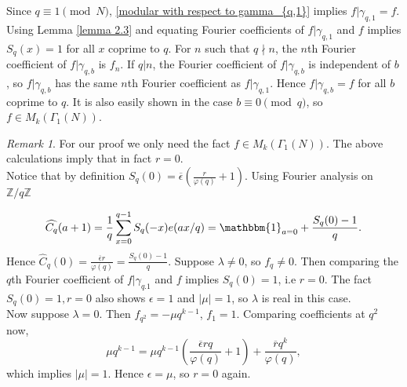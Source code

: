 \documentclass[a4paper,12.5pt]{amsart}
\theoremstyle{definition}
\theoremstyle{remark}
\newtheorem*{rem}{Remark}
\begin{document}
                                 Since $q \equiv 1 \pmod{N}$, \eqref{modular with respect to gamma_{q,1}}  implies
                 $f|\gamma_{q,1}=f$. 
                           Using Lemma \ref{lemma 2.3} and equating Fourier coefficients of $f|\gamma_{q,1}$ and $f$  implies  $S_q(x)=1$ for all $x$ coprime to $q$.
                                For $n$ such that $q \nmid  n $, the $n$th Fourier coefficient of $f|\gamma_{q,b}$ is $f_n$. If $q|n$, the Fourier coefficient of $f|\gamma_{q,b}$ is independent of $b$, so $f|\gamma_{q,b}$ has the same $n$th Fourier coefficient as $f|\gamma_{q,1}$. Hence $f|\gamma_{q,b}=f$ for all $b$ coprime to $q$. It is also easily shown in  the case $b \equiv 0  \pmod{q}$, so  $f \in M_k ( \Gamma_1(N)) $. 
                                
                                \begin{rem}
                               For our proof we only need the fact $f \in M_k ( \Gamma_1(N)) $.  The above calculations imply that in fact $r=0$. \\               
                        
                                Notice that by definition $ S_q(0)=  \overline{ \epsilon } \left( \frac{  r}{ \varphi(q)} +1  \right)          $.
                        Using Fourier analysis on $\mathbb{Z}/ q \mathbb{Z}$
                            
                            \[ \widehat{C_q}(a+1)=  \frac{1 }{q} \sum_{x=0}^{q-1} S_q(-x) e( ax/q) =   \mathbbm{1} _{a=0} +   \frac{ S_q(0)-1}{q} .\] 
                            Hence $\widehat{C}_q(0)= \frac{ \overline{ \epsilon } r}{ \varphi(q)} = \frac{S_q(0)-1}{q}$.
                              Suppose $ \lambda \neq 0$, so $f_q \neq 0$. Then comparing   the $q$th Fourier coefficient of $f|\gamma_{q.1}$ and $f$ implies  $ S_q(0)=1 $, i.e $r=0$. The fact $S_q(0)=1, r=0$ also shows $\epsilon=1$ and  $ |\mu|=1$,    so $\lambda$ is real in this case.
                              \\
                              Now suppose $\lambda=0$. Then $f_{q^2} = -\mu q^{k-1}$, $f_1=1$. Comparing coefficients at $q^2$ now, 
                              \[        \mu q^{k-1}= \mu q^{k-1} \left( \frac{ \overline{ \epsilon} r q }{ \varphi(q)}+1      \right)  + \frac{\overline{r} q^k}{ \varphi(q)} ,                       \]
                               which implies $|\mu|=1$. Hence $ \epsilon= \mu$, so $r=0$ again. 
                        \end{rem}
                
\end{document}

